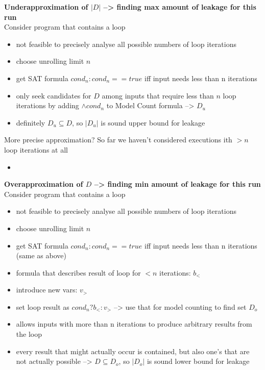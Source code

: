 \textbf{Underapproximation of $|D|$ --> finding max amount of leakage for this run}\\
Consider program that contains a loop
\begin{itemize}
    \item not feasible to precisely analyse all possible numbers of loop iterations
    \item choose unrolling limit $n$
    \item get SAT formula $cond_n: cond_n == true$ iff input needs less than n iterations
    \item only seek candidates for $D$ among inputs that require less than $n$ loop iterations by adding $\land cond_n$ to Model Count formula --> $D_u$
    \item definitely $D_u \subseteq D$, so $|D_u|$ is sound upper bound for leakage
\end{itemize}
More precise approximation? So far we haven't considered executions ith $>n$ loop iterations at all
\begin{itemize}
    \item 
\end{itemize}

\textbf{Overapproximation of $D$ --> finding min amount of leakage for this run}
Consider program that contains a loop
\begin{itemize}
    \item not feasible to precisely analyse all possible numbers of loop iterations
    \item choose unrolling limit $n$
    \item get SAT formula $cond_n: cond_n == true$ iff input needs less than n iterations (same as above)
    \item formula that describes result of loop for $< n$ iterations: $b_{<}$
    \item introduce new vars: $v_>$
    \item set loop result as $cond_n ? b_{<} : v_>$ --> use that for model counting to find set $D_o$
    \item allows inputs with more than n iterations to produce arbitrary results from the loop
    \item every result that might actually occur is contained, but also one's that are not actually possible --> $D \subseteq D_o$, so $|D_o|$ is sound lower bound for leakage
\end{itemize}


